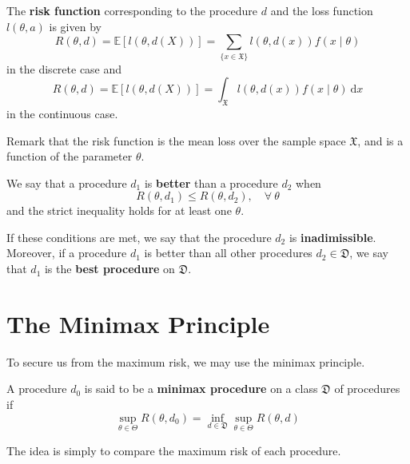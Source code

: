 \documentclass[12pt,a4paper]{report}
\begin{document}
\begin{definition}
    The \textbf{risk function} corresponding to the procedure $d$ and the loss function $l(\theta, a)$ is given by 
    \begin{equation}
        R(\theta, d) = \mathbb{E}[l(\theta, d(X))] = \sum_{\{ x \in \mathfrak{X} \}} l(\theta, d(x)) f (x \mid \theta)
    \end{equation}
    in the discrete case and 
    \begin{equation}
        R(\theta, d) = \mathbb{E}[l(\theta, d(X))] = \int_{\mathfrak{X}} l(\theta, d(x)) f (x \mid \theta) ~\mathrm{d}x
    \end{equation}
    in the continuous case.
\end{definition}

Remark that the risk function is the mean loss over the sample space $\mathfrak{X}$, and is a function of the parameter $\theta$. 

\begin{definition}
    We say that a procedure $d_1$ is \textbf{better} than a procedure $d_2$ when 
    \begin{equation}\label{eq:bet_proc}
        R(\theta, d_1) \leq R(\theta, d_2), \quad \forall ~\theta 
    \end{equation}
    and the strict inequality holds for at least one $\theta$. 

    If these conditions are met, we say that the procedure $d_2$ is \textbf{inadimissible}. Moreover, if a procedure $d_1$ is better than all other procedures $d_2 \in \mathfrak{D}$, we say that $d_1$ is the \textbf{best procedure} on $\mathfrak{D}$. 
\end{definition}

\section{The Minimax Principle}

To secure us from the maximum risk, we may use the minimax principle.

\begin{definition}
    A procedure $d_0$ is said to be a \textbf{minimax procedure} on a class $\mathfrak{D}$ of procedures if 
    \[
        \sup_{\theta \in \Theta} R(\theta, d_0) = \inf_{d \in \mathfrak{D}} \sup_{\theta \in \Theta} R(\theta, d)
    \]
\end{definition}

The idea is simply to compare the maximum risk of each procedure. 
\end{document}
